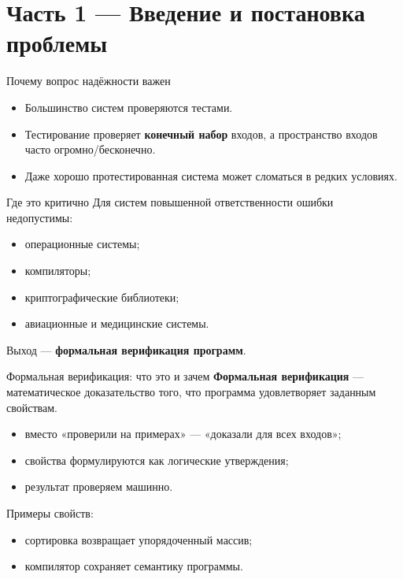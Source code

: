 \section{Часть 1 — Введение и постановка проблемы}

\begin{frame}{Почему вопрос надёжности важен}
\begin{itemize}
  \item Большинство систем проверяются тестами.
  \item Тестирование проверяет \textbf{конечный набор} входов, а пространство входов часто огромно/бесконечно.
  \item Даже хорошо протестированная система может сломаться в редких условиях.
\end{itemize}
\end{frame}

\begin{frame}{Где это критично}
Для систем повышенной ответственности ошибки недопустимы:
\begin{itemize}
  \item операционные системы;
  \item компиляторы;
  \item криптографические библиотеки;
  \item авиационные и медицинские системы.
\end{itemize}
\vspace{2mm}
Выход — \textbf{формальная верификация программ}.
\end{frame}

\begin{frame}{Формальная верификация: что это и зачем}
\textbf{Формальная верификация} — математическое доказательство того, что программа удовлетворяет заданным свойствам.
\begin{itemize}
  \item вместо «проверили на примерах» — «доказали для всех входов»;
  \item свойства формулируются как логические утверждения;
  \item результат проверяем машинно.
\end{itemize}
\vspace{2mm}
Примеры свойств:
\begin{itemize}
  \item сортировка возвращает упорядоченный массив;
  \item компилятор сохраняет семантику программы.
\end{itemize}
\end{frame}

